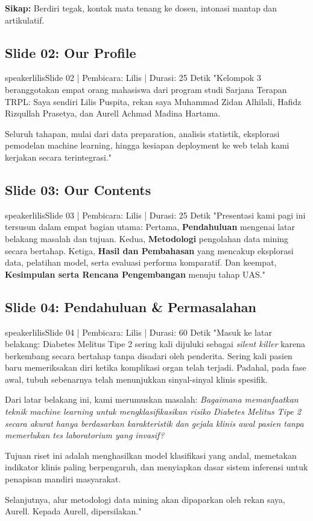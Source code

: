 \documentclass[11pt,a4paper]{article}
\begin{document}
\begin{defensebox}
\textbf{Sikap:} Berdiri tegak, kontak mata tenang ke dosen, intonasi mantap dan artikulatif.
\end{defensebox}

\subsection{Slide 02: Our Profile}
\begin{scriptbox}{speakerlilis}{Slide 02 | Pembicara: Lilis | Durasi: 25 Detik}
"Kelompok 3 beranggotakan empat orang mahasiswa dari program studi Sarjana Terapan TRPL:
Saya sendiri Lilis Puspita, rekan saya Muhammad Zidan Alhilali, Hafidz Rizqullah Prasetya, dan Aurell Achmad Madina Hartama. 

Seluruh tahapan, mulai dari data preparation, analisis statistik, eksplorasi pemodelan machine learning, hingga kesiapan deployment ke web telah kami kerjakan secara terintegrasi."
\end{scriptbox}

\subsection{Slide 03: Our Contents}
\begin{scriptbox}{speakerlilis}{Slide 03 | Pembicara: Lilis | Durasi: 25 Detik}
"Presentasi kami pagi ini tersusun dalam empat bagian utama:
Pertama, \textbf{Pendahuluan} mengenai latar belakang masalah dan tujuan.
Kedua, \textbf{Metodologi} pengolahan data mining secara bertahap.
Ketiga, \textbf{Hasil dan Pembahasan} yang mencakup eksplorasi data, pelatihan model, serta evaluasi performa komparatif.
Dan keempat, \textbf{Kesimpulan serta Rencana Pengembangan} menuju tahap UAS."
\end{scriptbox}

\subsection{Slide 04: Pendahuluan \& Permasalahan}
\begin{scriptbox}{speakerlilis}{Slide 04 | Pembicara: Lilis | Durasi: 60 Detik}
"Masuk ke latar belakang: Diabetes Melitus Tipe 2 sering kali dijuluki sebagai \textit{silent killer} karena berkembang secara bertahap tanpa disadari oleh penderita. Sering kali pasien baru memeriksakan diri ketika komplikasi organ telah terjadi. Padahal, pada fase awal, tubuh sebenarnya telah menunjukkan sinyal-sinyal klinis spesifik.

Dari latar belakang ini, kami merumuskan masalah: \textit{Bagaimana memanfaatkan teknik machine learning untuk mengklasifikasikan risiko Diabetes Melitus Tipe 2 secara akurat hanya berdasarkan karakteristik dan gejala klinis awal pasien tanpa memerlukan tes laboratorium yang invasif?}

Tujuan riset ini adalah menghasilkan model klasifikasi yang andal, memetakan indikator klinis paling berpengaruh, dan menyiapkan dasar sistem inferensi untuk penapisan mandiri masyarakat. 

Selanjutnya, alur metodologi data mining akan dipaparkan oleh rekan saya, Aurell. Kepada Aurell, dipersilakan."
\end{scriptbox}
\end{document}
